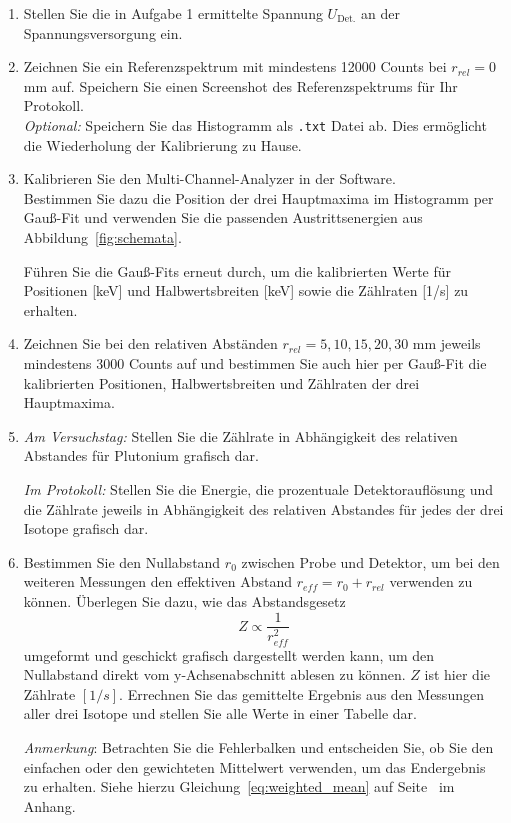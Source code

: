 \begin{enumerate}[label=\textbf{\alph*)}]
	\item Stellen Sie die in Aufgabe 1 ermittelte Spannung $U_{\text{Det.}}$ an der Spannungsversorgung ein.
	\item Zeichnen Sie ein Referenzspektrum mit mindestens 12000 Counts bei $r_{rel} = 0$ mm auf. Speichern Sie einen Screenshot des Referenzspektrums für Ihr Protokoll.
		\\ \textit{Optional:} Speichern Sie das Histogramm als \verb|.txt| Datei ab. Dies ermöglicht die Wiederholung der Kalibrierung zu Hause. 
	\item Kalibrieren Sie den Multi-Channel-Analyzer in der Software. \\Bestimmen Sie dazu die Position der drei Hauptmaxima im Histogramm per Gauß-Fit und verwenden Sie die passenden Austrittsenergien aus Abbildung~\ref{fig:schemata}.
	
	Führen Sie die Gauß-Fits erneut durch, um die kalibrierten Werte für Positionen [keV] und Halbwertsbreiten [keV] sowie die Zählraten [1/s] zu erhalten.
	\item Zeichnen Sie bei den relativen Abständen $r_{rel} = 5, 10, 15, 20, 30$ mm jeweils mindestens 3000 Counts auf und bestimmen Sie auch hier per Gauß-Fit die kalibrierten Positionen, Halbwertsbreiten und Zählraten der drei Hauptmaxima.
	\item \textit{Am Versuchstag:} Stellen Sie die Zählrate in Abhängigkeit des relativen Abstandes für Plutonium grafisch dar.
	
	\textit{Im Protokoll:} Stellen Sie die Energie, die prozentuale Detektorauflösung und die Zählrate  jeweils in Abhängigkeit des relativen Abstandes für jedes der drei Isotope grafisch dar.
	\item Bestimmen Sie den Nullabstand $r_0$ zwischen Probe und Detektor, um bei den weiteren Messungen den effektiven Abstand $r_{eff} = r_0 + r_{rel}$ verwenden zu können. Überlegen Sie dazu, wie das Abstandsgesetz
	\begin{equation}
		Z \propto \frac{1}{r^2_{eff}}
	\end{equation}
	umgeformt und geschickt grafisch dargestellt werden kann, um den Nullabstand direkt vom y-Achsenabschnitt ablesen zu können. $Z$ ist hier die Zählrate $[1/s]$. Errechnen Sie das gemittelte Ergebnis aus den Messungen aller drei Isotope und stellen Sie alle Werte in einer Tabelle dar.

    \textit{Anmerkung}: Betrachten Sie die Fehlerbalken und entscheiden Sie, ob Sie den einfachen oder den gewichteten Mittelwert verwenden, um das Endergebnis zu erhalten. Siehe hierzu Gleichung~\eqref{eq:weighted_mean} auf Seite~\pageref{eq:weighted_mean} im Anhang.
	

\end{enumerate}

